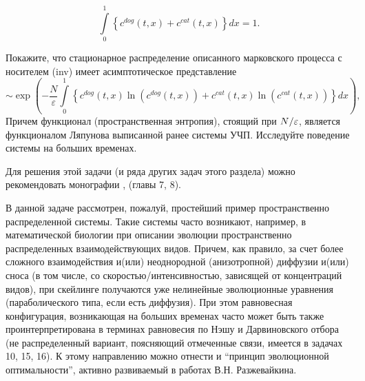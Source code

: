 \begin{problem}
\[\tag{inv}
\int\limits_0^1 {\left\{ {c^{dog}\left( {t,x} \right)+c^{cat}\left( {t,x} \right)} \right\}dx} =1.
\] 

Покажите, что стационарное распределение описанного марковского процесса с 
носителем (inv) имеет асимптотическое представление
\[
\sim \exp \left( {-\frac{N}{\varepsilon }\int\limits_0^1 {\left\{ 
{c^{dog}\left( {t,x} \right)\ln \left( {c^{dog}\left( {t,x} \right)} 
\right)+c^{cat}\left( {t,x} \right)\ln \left( {c^{cat}\left( {t,x} \right)} 
\right)} \right\}dx} } \right),
\]
Причем функционал (пространственная энтропия), стоящий при $N 
\mathord{\left/ {\vphantom {N \varepsilon }} \right. 
\kern-\nulldelimiterspace} \varepsilon $, является функционалом Ляпунова 
выписанной ранее системы УЧП. Исследуйте поведение системы на больших 
временах.

\end{problem}

\begin{remark}
Для решения этой задачи (и ряда других задач этого 
раздела) можно рекомендовать монографии \cite{101}, \cite{333}  (главы 7, 8).

В данной задаче рассмотрен, пожалуй, простейший пример пространственно 
распределенной системы. Такие системы часто возникают, например, в 
математической биологии при описании эволюции пространственно распределенных 
взаимодействующих видов. Причем, как правило, за счет более сложного 
взаимодействия и(или) неоднородной (анизотропной) диффузии и(или) сноса (в 
том числе, со скоростью/интенсивностью, зависящей от концентраций видов), 
при скейлинге получаются уже нелинейные эволюционные уравнения 
(параболического типа, если есть диффузия). При этом равновесная 
конфигурация, возникающая на больших временах часто может быть также 
проинтерпретирована в терминах равновесия по Нэшу и Дарвиновского отбора (не 
распределенный вариант, поясняющий отмеченные связи, имеется в задачах 10, 
15, 16). К этому направлению можно отнести и ``принцип эволюционной 
оптимальности'', активно развиваемый в работах В.Н. Разжевайкина.
\end{remark}



